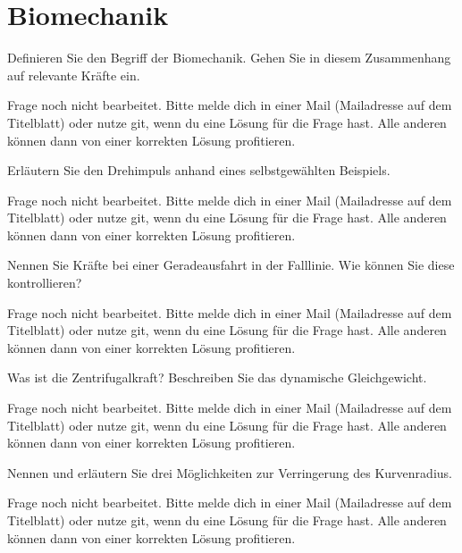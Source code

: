 \section{Biomechanik}

\begin{question}{6}
    Definieren Sie den Begriff der Biomechanik. Gehen Sie in diesem Zusammenhang auf relevante Kräfte ein.
\end{question}
\begin{solution}
    Frage noch nicht bearbeitet. Bitte melde dich in einer Mail (Mailadresse auf dem Titelblatt) oder nutze git, wenn du eine Lösung für die Frage hast. Alle anderen können dann von einer korrekten Lösung profitieren.
\end{solution}

\begin{question}{3}
    Erläutern Sie den Drehimpuls anhand eines selbstgewählten Beispiels.
\end{question}
\begin{solution}
    Frage noch nicht bearbeitet. Bitte melde dich in einer Mail (Mailadresse auf dem Titelblatt) oder nutze git, wenn du eine Lösung für die Frage hast. Alle anderen können dann von einer korrekten Lösung profitieren.
\end{solution}

\begin{question}{3}
    Nennen Sie Kräfte bei einer Geradeausfahrt in der Falllinie. Wie können Sie diese kontrollieren?
\end{question}
\begin{solution}
    Frage noch nicht bearbeitet. Bitte melde dich in einer Mail (Mailadresse auf dem Titelblatt) oder nutze git, wenn du eine Lösung für die Frage hast. Alle anderen können dann von einer korrekten Lösung profitieren.
\end{solution}

\begin{question}{3}
    Was ist die Zentrifugalkraft? Beschreiben Sie das dynamische Gleichgewicht.
\end{question}
\begin{solution}
    Frage noch nicht bearbeitet. Bitte melde dich in einer Mail (Mailadresse auf dem Titelblatt) oder nutze git, wenn du eine Lösung für die Frage hast. Alle anderen können dann von einer korrekten Lösung profitieren.
\end{solution}

\begin{question}{3}
    Nennen und erläutern Sie drei Möglichkeiten zur Verringerung des Kurvenradius.
\end{question}
\begin{solution}
    Frage noch nicht bearbeitet. Bitte melde dich in einer Mail (Mailadresse auf dem Titelblatt) oder nutze git, wenn du eine Lösung für die Frage hast. Alle anderen können dann von einer korrekten Lösung profitieren.
\end{solution}

